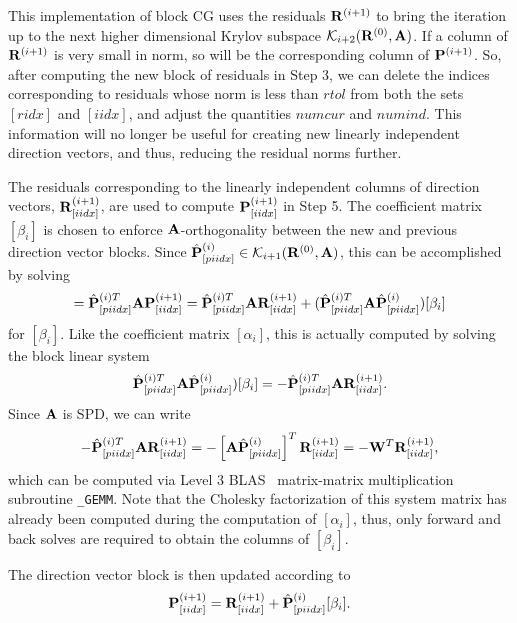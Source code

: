 \documentclass[twoside]{siamltex}
\newcommand{\bA}{{\bf A}}
\newcommand{\bP}{{\bf P}}
\newcommand{\bW}{{\bf W}}
\newcommand{\bR}{{\bf R}}
\newcommand{\dm}{\begin{displaymath}}
\newcommand{\edm}{\end{displaymath}}
\begin{document}
This implementation of block CG uses the residuals $\bR^{(i+1)}$
to bring the iteration up to the next higher dimensional Krylov
subspace ${\cal K}_{i+2}(\bR^{(0)}, \bA)$. If a column of
$\bR^{(i+1)}$ is very small in norm, so will be the corresponding
column of $\bP^{(i+1)}$. So, after computing the new block of
residuals in Step 3, we can delete the indices corresponding to
residuals whose norm is less than $rtol$ from both the sets
$[ridx]$ and $[iidx]$, and adjust the quantities $numcur$ and
$numind$. This information will no longer be useful for creating
new linearly independent direction vectors, and thus, reducing the
residual norms further.

The residuals corresponding to the linearly independent columns of
direction vectors, $\bR^{(i+1)}_{[iidx]}$, are used to compute
$\bP^{(i+1)}_{[iidx]}$ in Step 5.  The coefficient matrix
$[\beta_i]$ is chosen to enforce $\bA$-orthogonality between the
new and previous direction vector blocks. Since ${\hat
\bP}^{(i)}_{[piidx]} \in {\cal K}_{i+1}(\bR^{(0)}, \bA)$, this can
be accomplished by solving
 \dm
 [ {\bf 0} ] = {\hat \bP}^{(i)T}_{[piidx]} \bA \bP^{(i+1)}_{[iidx]} =
   {\hat \bP}^{(i)T}_{[piidx]} \bA \bR^{(i+1)}_{[iidx]}
  + ( {\hat \bP}^{(i)T}_{[piidx]} \bA {\hat \bP}^{(i)}_{[piidx]})
 [ \beta_i ]
 \edm
for $[\beta_i]$. Like the coefficient matrix $[\alpha_i]$, this is
actually computed by solving the block linear system
 \dm
  {\hat \bP}^{(i)T}_{[piidx]} \bA {\hat \bP}^{(i)}_{[piidx]})
 [ \beta_i ] =  -{\hat \bP}^{(i)T}_{[piidx]} \bA \bR^{(i+1)}_{[iidx]}.
 \edm
Since $\bA$ is SPD, we can write
 \dm
  -{\hat \bP}^{(i)T}_{[piidx]} \bA \bR^{(i+1)}_{[iidx]} = - \left[
  \bA {\hat \bP}_{[piidx]}^{(i)} \right]^T \bR_{[iidx]}^{(i+1)} =
  -\bW^T \bR_{[iidx]}^{(i+1)},
  \edm
which can be computed via Level 3 {\small BLAS}~\cite{dddh:90}
matrix-matrix multiplication subroutine {\tt \_GEMM}. Note that
the Cholesky factorization of this system matrix has already been
computed during the computation of $[\alpha_i]$, thus, only
forward and back solves are required to obtain the columns of
$[\beta_i]$.

The direction vector block is then updated according to
 \dm
 \bP_{[iidx]}^{(i+1)} = \bR_{[iidx]}^{(i+1)} + {\hat
 \bP}_{[piidx]}^{(i)} [\beta_i].
 \edm
\end{document}
